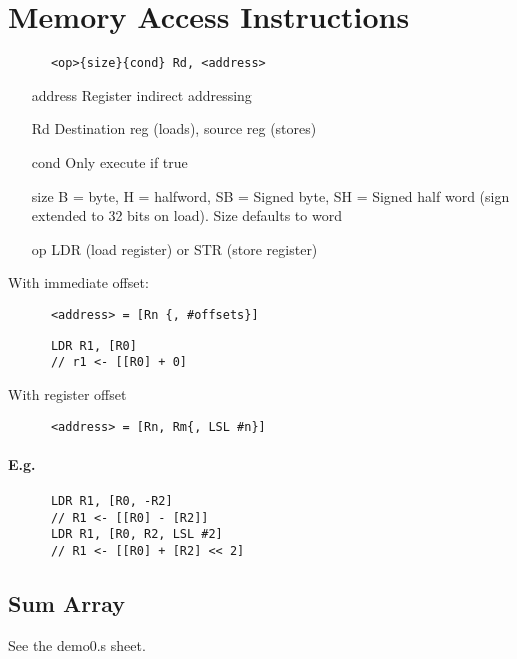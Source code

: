   \section{Memory Access Instructions}
    \begin{lstlisting}
      <op>{size}{cond} Rd, <address>
    \end{lstlisting}
    \begin{itemize}
      \item[address] Register indirect addressing
      \item[Rd] Destination reg (loads), source reg (stores)
      \item[cond] Only execute if true
      \item[size] B = byte, H = halfword, SB = Signed byte, SH = Signed half
      word (sign extended to 32 bits on load). Size defaults to word
      \item[op] LDR (load register) or STR (store register)
    \end{itemize}
    With immediate offset:
    \begin{lstlisting}
      <address> = [Rn {, #offsets}]
    \end{lstlisting}
    \begin{lstlisting}
      LDR R1, [R0]
      // r1 <- [[R0] + 0]
    \end{lstlisting}
    With register offset
    \begin{lstlisting}
      <address> = [Rn, Rm{, LSL #n}]
    \end{lstlisting}
    \paragraph{E.g.}
    \begin{lstlisting}
      LDR R1, [R0, -R2]
      // R1 <- [[R0] - [R2]]
      LDR R1, [R0, R2, LSL #2]
      // R1 <- [[R0] + [R2] << 2]
    \end{lstlisting}

  \subsection{Sum Array}
    See the demo0.s sheet.

